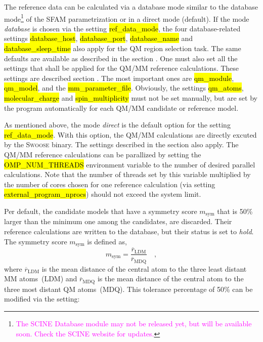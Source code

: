 \documentclass[]{tufte-book}
\begin{document}
{{The reference data can be calculated via a database mode similar to the database mode\footnote{\textcolor{magenta}{The SCINE Database module may not be released yet, but will be available soon. Check the SCINE website for updates.}} of the SFAM parametrization or in a direct mode (default). If the mode \textit{database} is chosen via the setting \hl{ref\_data\_mode}, the four database-related settings
\hl{database\_host}, 
\hl{database\_port}, 
\hl{database\_name} and
\hl{database\_sleep\_time}
also apply for the QM region selection task. The same defaults are available as described in the section . One must also set all the settings that shall be applied for the QM/MM reference calculations. These settings are described section . The most important ones are \hl{qm\_module}, \hl{qm\_model}, and the \hl{mm\_parameter\_file}. Obviously, the settings \hl{qm\_atoms}, \hl{molecular\_charge} and \hl{spin\_multiplicity} must not be set manually, but are set by the program automatically for each QM/MM candidate or reference model.

As mentioned above, the mode \textit{direct} is the default option for the setting \hl{ref\_data\_mode}. With this option, the QM/MM calculations are directly excuted by the \textsc{Swoose} binary. The settings described in the section  also apply. The QM/MM reference calculations can be parallized by setting the \hl{OMP\_NUM\_THREADS} environment variable to the number of desired parallel calculations. Note that the number of threads set by this variable multiplied by the number of cores chosen for one reference calculation (via setting \hl{external\_program\_nprocs}) should not exceed the system limit.

Per default, the candidate models that have a symmetry score $m_\text{sym}$ that is 50\% larger than the minimum one among the candidates, are discarded. Their reference calculations are written to the database, but their status is set to \textit{hold}. The symmetry score $m_\text{sym}$ is defined as,
\begin{equation}
 m_\text{sym} = \frac{\overline{r}_\text{LDM}}{\overline{r}_\text{MDQ}} \quad , \label{eq:symm_score}
\end{equation}
where $\overline{r}_\text{LDM}$ is the mean distance of the central atom to the three least distant MM atoms~(LDM) and $\overline{r}_\text{MDQ}$
is the mean distance of the central atom to the three most distant QM atoms~(MDQ). This tolerance percentage of 50\% can be modified via the setting:

}}
\end{document}
